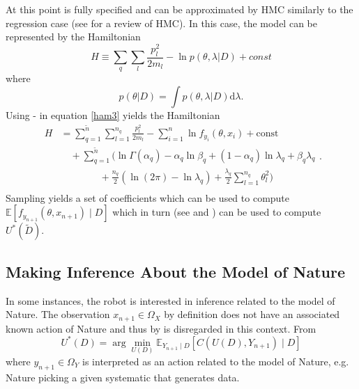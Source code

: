 At this point  is fully specified and can be approximated by HMC similarly to the regression case (see  for a review of HMC). In this case, the model can be represented by the Hamiltonian 
\begin{equation}
	H \equiv  \sum_{q}\sum_{l}\frac{p_{l}^2}{2m_{l}}-\ln p(\theta,\lambda|D)+const
	\label{ham3}
\end{equation}
where
\begin{equation}
	p(\theta|D) = \int p(\theta,\lambda|D) \mathrm{d} \lambda.
\end{equation}
Using - in equation \eqref{ham3} yields the Hamiltonian
\begin{equation}
	\begin{split}
		H&=\sum_{q=1}^{\tilde{n}}\sum_{l=1}^{n_q}\frac{p_{l}^2}{2m_{l}}-\sum_{i=1}^{n}\ln f_{y_i}(\theta,x_i)+\text{const}\\
		&\quad+\sum_{q=1}^{\tilde{n}}\bigg(\ln\Gamma(\alpha_q)-\alpha_q\ln\beta_q+(1-\alpha_q)\ln\lambda_q+\beta_q\lambda_q\\
		&\qquad \qquad+\frac{n_q}{2}(\ln(2\pi)-\ln\lambda_q)+\frac{\lambda_q}{2}\sum_{l=1}^{n_q}\theta_l^2\bigg)\\
	\end{split}.
	\label{ham2}
\end{equation}
Sampling  yields a set of coefficients which can be used to compute $\mathbb{E}[f_{y_{n+1}}(\theta,x_{n+1})\mid D]$ which in turn (see  and ) can be used to compute $U^*(\tilde{D})$.


\subsection{Making Inference About the Model of Nature}
In some instances, the robot is interested in inference related to the model of Nature. The observation $x_{n+1}\in \Omega_X$ by definition does not have an associated known action of Nature and thus by  is disregarded in this context. From 
\begin{equation}
	U^*(D) = \arg\min_{U(D)} \mathbb{E}_{Y_{n+1}\mid D}[C(U(D), Y_{n+1})\mid D]
	\label{eq:best_decision}
\end{equation}
where $y_{n+1} \in \Omega_Y$ is interpreted as an action related to the model of Nature, e.g. Nature picking a given systematic that generates data.


